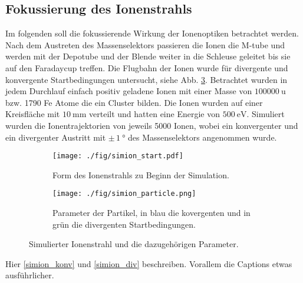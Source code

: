 \subsection{Fokussierung des Ionenstrahls}
Im folgenden soll die fokussierende Wirkung der Ionenoptiken betrachtet werden.
Nach dem Austreten des Massenselektors passieren die Ionen die M-tube und werden mit der Depotube und der Blende weiter in die Schleuse geleitet bis sie auf den Faradaycup treffen.
Die Flugbahn der Ionen wurde für divergente und konvergente Startbedingungen untersucht, siehe Abb. \ref{fig:simion_start}.
Betrachtet wurden in jedem Durchlauf einfach positiv geladene Ionen mit einer Masse von $\SI{100000}{\amu}$ bzw. 1790 Fe Atome die ein Cluster bilden.
Die Ionen wurden auf einer Kreisfläche mit $\SI{10}{\mm}$ verteilt und hatten eine Energie von $\SI{500}{\eV}$.
Simuliert wurden die Ionentrajektorien von jeweils 5000 Ionen, wobei ein konvergenter und ein divergenter Austritt mit $\pm\,\SI{1}{\degree}$ des Massenselektors angenommen wurde.

\begin{figure}
  \centering
  \begin{subfigure}[h]{0.5\textwidth}
    \texttt{[image: ./fig/simion\_start.pdf]}
    \caption{Form des Ionenstrahls zu Beginn der Simulation.}
    \label{fig:strahlform}
  \end{subfigure}\hfill
  \begin{subfigure}[h]{0.475\textwidth}
    \texttt{[image: ./fig/simion\_particle.png]}
    \caption{Parameter der Partikel, in blau die kovergenten und in grün die divergenten Startbedingungen.}
    \label{fig:strahlparameter}
  \end{subfigure}
  \caption{Simulierter Ionenstrahl und die dazugehörigen Parameter.}
  \label{fig:simion_start}
\end{figure}

Hier \ref{simion_konv} und \ref{simion_div} beschreiben.
Vorallem die Captions etwas ausführlicher.


